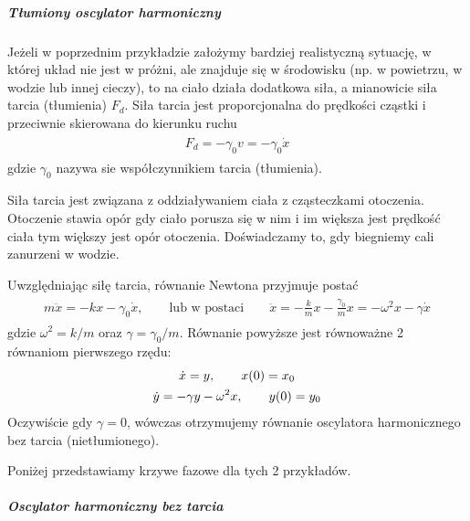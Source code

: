 \documentclass[a4paper,12pt,polish]{sphinxmanual}
\begin{document}
\subparagraph{Tłumiony oscylator harmoniczny}
\label{ch1/chI021:tlumiony-oscylator-harmoniczny}
Jeżeli w poprzednim przykładzie założymy bardziej realistyczną sytuację, w której  układ nie jest w próżni, ale znajduje się w środowisku (np. w powietrzu, w wodzie lub innej cieczy), to na ciało działa dodatkowa siła, a mianowicie siła tarcia  (tłumienia) $F_d$. Siła tarcia jest proporcjonalna do prędkości cząstki i przeciwnie skierowana do kierunku ruchu
\label{ch1/chI021:equation-eqn57}\begin{gather}
\begin{split}F_d = -\gamma_0 v = -\gamma_0 \dot x\end{split}\label{ch1/chI021-eqn57}
\end{gather}
gdzie $\gamma_0$ nazywa sie współczynnikiem tarcia (tłumienia).

Siła tarcia jest związana z oddziaływaniem ciała z cząsteczkami otoczenia. Otoczenie stawia opór gdy ciało porusza się w nim i im większa jest prędkość ciała tym większy jest opór otoczenia. Doświadczamy to, gdy biegniemy cali zanurzeni w wodzie.

Uwzględniając siłę tarcia, równanie Newtona przyjmuje postać
\label{ch1/chI021:equation-eqn58}\begin{gather}
\begin{split}m\ddot x = -kx - \gamma_0 \dot x, \quad \quad \mbox{lub w postaci} \quad \quad \ddot x = -\frac{k}{m} x - \frac{\gamma_0}{m} x = -\omega^2 x - \gamma \dot x\end{split}\label{ch1/chI021-eqn58}
\end{gather}
gdzie $\omega^2 = k/m$  oraz $\gamma = \gamma_0/m$. Równanie  powyższe  jest równoważne 2 równaniom pierwszego rzędu:
\label{ch1/chI021:equation-eqn59}\begin{gather}
\begin{split}\dot x = y, \quad \quad x(0) = x_0\end{split}\label{ch1/chI021-eqn59}\\\begin{split}\dot y = -\gamma y -\omega^2 x, \quad \quad y(0) = y_0\end{split}\notag
\end{gather}
Oczywiście gdy $\gamma = 0$, wówczas  otrzymujemy równanie oscylatora harmonicznego bez tarcia (nietłumionego).

Poniżej przedstawiamy krzywe fazowe dla tych 2 przykładów.


\subparagraph{Oscylator harmoniczny bez tarcia}
\label{ch1/chI021:oscylator-harmoniczny-bez-tarcia}
\end{document}
